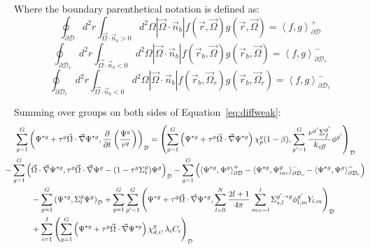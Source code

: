 \documentclass[11pt]{tamurmemo}
\newcommand{\grad}{\vec{\nabla}}
\newcommand{\be}{\begin{equation}}
\newcommand{\ee}{\end{equation}}
\newcommand{\kef}{\ensuremath{k_{\textit{eff}}}}
\newcommand{\keff}{\kef\xspace}
\newcommand{\vo}{\vec{\Omega}}
\newcommand{\vr}{\vec{r}}
\newcommand{\vn}{\vec{n}}
\newcommand{\qq}{\quad\quad}
\newcommand{\D}{\ensuremath{\mathcal{D}}}
\begin{document}
Where the boundary parenthetical notation is defined as:
\be
\oint_{\partial \D}d^2r\int_{\vo\cdot\vn_b >0}d^2\Omega\left|\vo\cdot\vn_b\right|f(\vr,\vo) g(\vr,\vo) = \left\langle f,g \right\rangle_{\partial \D}^+
\ee
\be
\oint_{\partial \D_s}d^2r\int_{\vo\cdot\vn_b <0}d^2\Omega\left|\vo\cdot\vn_b\right|f(\vr_b,\vo) g(\vr_b,\vo) = \left\langle f,g \right\rangle_{\partial \D_s}^-
\ee
\be
\oint_{\partial \D_r}d^2r\int_{\vo\cdot\vn_b <0}d^2\Omega\left|\vo\cdot\vn_b\right|f(\vr_b,\vo_r) g(\vr_b,\vo_r) = \left\langle f,g \right\rangle_{\partial \D_r}^-
\ee

Summing over groups on both sides of Equation~\ref{eq:diffweak}:
\begin{align}
&\sum_{g=1}^G\left(\Psi^{*g}+\tau^g\vo\cdot\grad\Psi^{*g},\frac{\partial}{\partial t}\left(\frac{\Psi^g}{v^g}\right)\right)_\D = \left(\sum_{g=1}^G\left(\Psi^{*g}+\tau^g\vo\cdot\grad\Psi^{*g}\right)\chi_p^g(1-\beta),\sum_{g'=1}^G \frac{\nu^{g'} \Sigma_f^{g'}}{\keff} \phi^{g'}\right)_\D \nonumber \\
& \hspace{-5mm} - \sum_{g=1}^G\left(\vo\cdot\grad\Psi^{*g}, \tau^g\vo\cdot\grad\Psi^g - (1 - \tau^g\Sigma_t^g)\Psi^g\right)_\D - \sum_{g=1}^G\left(\left\langle\Psi^{*g},\Psi^{g}\right\rangle_{\partial \D}^+ - \left\langle\Psi^{*g},\Psi^{g}_{inc}\right\rangle_{\partial \D_s}^- - \left\langle\Psi^{*g},\Psi^{g}\right\rangle_{\partial \D_r}^-\right)  \nonumber \\
& \qq - \sum_{g=1}^G\left(\Psi^{*g},\Sigma_t^g\Psi^g\right)_\D + \sum_{g=1}^G\sum_{g'=1}^G\left(\Psi^{*g}+\tau^g\vo\cdot\grad\Psi^{*g},\sum_{l=0}^N \frac{2l+1}{4\pi}\sum_{m=-l}^l\Sigma_{s,l}^{g'\to g} \phi^{g'}_{l,m}Y_{l,m}\right)_\D \nonumber \\
& \qq + \sum_{i=1}^I \left(\sum_{g=1}^G\left(\Psi^{*g}+\tau^g\vo\cdot\grad\Psi^{*g}\right)\chi_{d,i}^g,\lambda_i C_i\right)_\D
\end{align}
\end{document}
